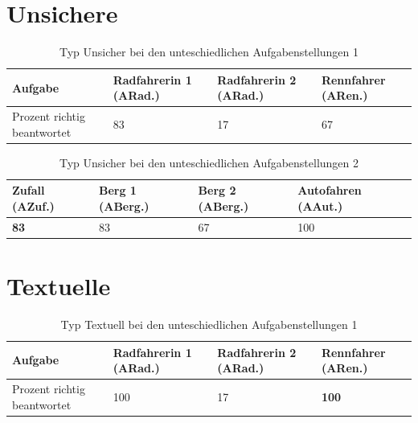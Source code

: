 \section*{Unsichere}
\begin{table}[H]
\hspace{-5pt}
\begin{tabularx}{\textwidth + 5pt}{| @{\hspace{3pt}} M || @{\hspace{3pt}} M  | @{\hspace{3pt}} M | @{\hspace{3pt}} M |}
\hline
\textbf{Aufgabe} & \textbf{Radfahrerin 1 (ARad.)} & \textbf{Radfahrerin 2 (ARad.)} & \textbf{Rennfahrer (ARen.)} \\
\hline
\hline
Prozent richtig beantwortet       & 83 & 17 & 67 \\
\hline
\end{tabularx}
\caption{Typ Unsicher bei den unteschiedlichen Aufgabenstellungen 1}
\end{table}

\begin{table}[H]
\hspace{-5pt}
\begin{tabularx}{\textwidth + 5pt}{| @{\hspace{3pt}} M | @{\hspace{3pt}} M  | @{\hspace{3pt}} M | @{\hspace{3pt}} M |}
\hline
\textbf{Zufall (AZuf.)} & \textbf{Berg 1 (ABerg.)} & \textbf{Berg 2 (ABerg.)} & \textbf{Autofahren (AAut.)}\\
\hline
\hline
    \textbf{83} & 83 & 67 &  100\\
\hline
\end{tabularx}
\caption{Typ Unsicher bei den unteschiedlichen Aufgabenstellungen 2}
\end{table}

\section*{Textuelle}
\begin{table}[H]
\hspace{-5pt}
\begin{tabularx}{\textwidth + 5pt}{| @{\hspace{3pt}} M || @{\hspace{3pt}} M  | @{\hspace{3pt}} M | @{\hspace{3pt}} M |}
\hline
\textbf{Aufgabe} & \textbf{Radfahrerin 1 (ARad.)} & \textbf{Radfahrerin 2 (ARad.)} & \textbf{Rennfahrer (ARen.)} \\
\hline
\hline
Prozent richtig beantwortet       & 100 & 17 & \textbf{100} \\
\hline
\end{tabularx}
\caption{Typ Textuell bei den unteschiedlichen Aufgabenstellungen 1}
\end{table}



